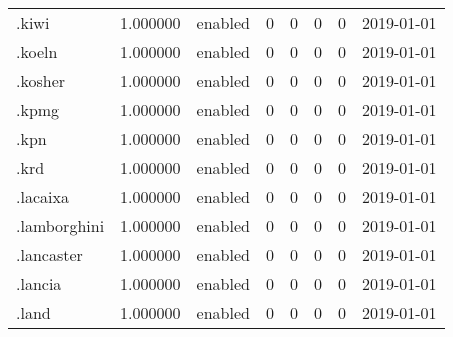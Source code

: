 \begin{tabular}{lrlrrrrl}
.kiwi                     &          1.000000 &         enabled &                           0 &                           0 &                           0 &                   0 &           2019-01-01 \\
.koeln                    &          1.000000 &         enabled &                           0 &                           0 &                           0 &                   0 &           2019-01-01 \\
.kosher                   &          1.000000 &         enabled &                           0 &                           0 &                           0 &                   0 &           2019-01-01 \\
.kpmg                     &          1.000000 &         enabled &                           0 &                           0 &                           0 &                   0 &           2019-01-01 \\
.kpn                      &          1.000000 &         enabled &                           0 &                           0 &                           0 &                   0 &           2019-01-01 \\
.krd                      &          1.000000 &         enabled &                           0 &                           0 &                           0 &                   0 &           2019-01-01 \\
.lacaixa                  &          1.000000 &         enabled &                           0 &                           0 &                           0 &                   0 &           2019-01-01 \\
.lamborghini              &          1.000000 &         enabled &                           0 &                           0 &                           0 &                   0 &           2019-01-01 \\
.lancaster                &          1.000000 &         enabled &                           0 &                           0 &                           0 &                   0 &           2019-01-01 \\
.lancia                   &          1.000000 &         enabled &                           0 &                           0 &                           0 &                   0 &           2019-01-01 \\
.land                     &          1.000000 &         enabled &                           0 &                           0 &                           0 &                   0 &           2019-01-01 \\

\end{tabular}
